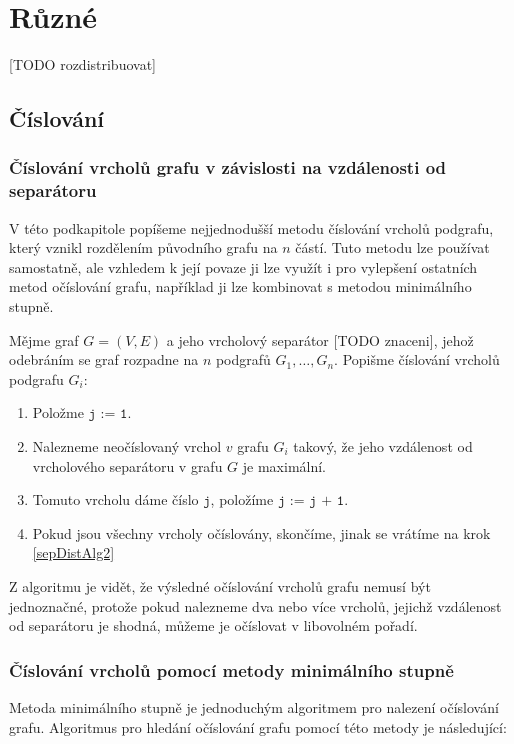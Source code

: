 \documentclass[11pt,american,czech,oneside]{book}
\theoremstyle{plain}
\theoremstyle{definition}
\begin{document}

\chapter{Různé}
[TODO rozdistribuovat]
\section{Číslování}
\subsection{Číslování vrcholů grafu v závislosti na vzdálenosti od separátoru}
\label{sepDistNumbering}

    V této podkapitole popíšeme nejjednodušší metodu číslování vrcholů podgrafu, který vznikl rozdělením původního grafu na $n$ částí.
    Tuto metodu lze používat samostatně, ale vzhledem k její povaze ji lze využít i pro vylepšení ostatních metod očíslování grafu,
    například ji lze kombinovat s metodou minimálního stupně.

    Mějme graf $G = (V,E)$ a jeho vrcholový separátor [TODO znaceni], jehož odebráním se graf rozpadne na $n$ podgrafů $G_1, \ldots, G_n$.
    Popišme číslování vrcholů podgrafu $G_i$:

    \begin{enumerate}
      \item Položme $\texttt{j := 1}$.
      \item \label{sepDistAlg2} Nalezneme neočíslovaný vrchol $v$ grafu $G_i$ takový, že jeho vzdálenost od vrcholového separátoru v grafu $G$ je maximální.
      \item Tomuto vrcholu dáme číslo $\texttt{j}$, položíme $\texttt{j := j + 1}$.
      \item Pokud jsou všechny vrcholy očíslovány, skončíme, jinak se vrátíme na krok \ref{sepDistAlg2}
    \end{enumerate}

    Z algoritmu je vidět, že výsledné očíslování vrcholů grafu nemusí být jednoznačné, protože pokud nalezneme dva nebo více vrcholů, jejichž vzdálenost
    od separátoru je shodná, můžeme je očíslovat v libovolném pořadí.

\subsection{Číslování vrcholů pomocí metody minimálního stupně}
Metoda minimálního stupně je jednoduchým algoritmem pro nalezení očíslování grafu.
Algoritmus pro hledání očíslování grafu pomocí této metody je následující:
\end{document}
